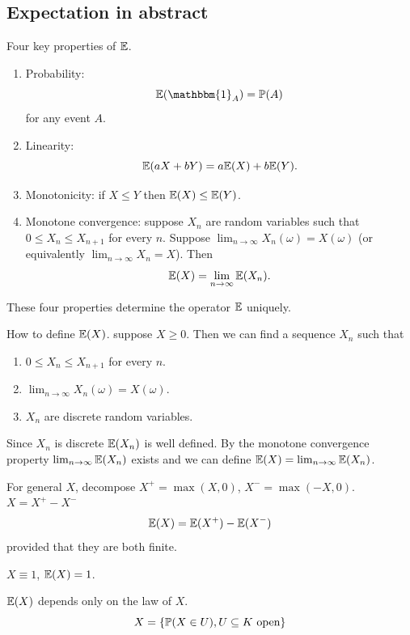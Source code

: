 \documentclass[10pt, a4paper]{article}
\begin{document}
\subsection{Expectation in abstract}
Four key properties of $\E$.

\begin{enumerate}[label = (\roman*)]
    \item Probability:
    \[
    \E(\mathbbm{1}_A) = \P(A)
    \]
    for any event $A$.

    \item Linearity:
    \[
    \E(aX + bY) = a\E(X) + b\E(Y).
    \]

    \item Monotonicity:
    if $X \leq Y$ then $\E(X) \leq \E(Y)$.

    \item Monotone convergence:
    suppose $X_n$ are random variables such that $0 \leq X_n \leq X_{n + 1}$ for every $n$.
    Suppose $\lim_{n \to \infty}X_n(\omega) = X(\omega)$
    (or equivalently $\lim_{n \to \infty}X_n = X$).
    Then
    \[
    \E(X) = \lim_{n \to \infty}\E(X_n).
    \]
\end{enumerate}
These four properties determine the operator $\E$ uniquely.

How to define $\E(X)$.
suppose $X \geq 0$.
Then we can find a sequence $X_n$ such that
\begin{enumerate}[label = (\roman*)]
    \item $0 \leq X_n \leq X_{n + 1}$ for every $n$.

    \item $\lim_{n \to \infty}X_n(\omega) = X(\omega)$.

    \item $X_n$ are discrete random variables.
\end{enumerate}
Since $X_n$ is discrete $\E(X_n)$ is well defined.
By the monotone convergence property $\lim_{n \to \infty}\E(X_n)$ exists and we can define $\E(X) = \lim_{n \to \infty}\E(X_n)$.

For general $X$,
decompose $X ^ {+} = \max(X, 0)$,
$X ^ {-} = \max(-X, 0)$.
$X = X ^ {+} - X ^ {-}$
\[
\E(X) = \E(X ^ {+}) - \E(X ^ {-})
\]
provided that they are both finite.

\begin{example}
    $X \equiv 1$,
    $\E(X) = 1$.
\end{example}

$\E(X)$ depends only on the law of $X$.
\[
X = \{\P(X \in U), U \subseteq K\text{ open}\}
\]
\end{document}
